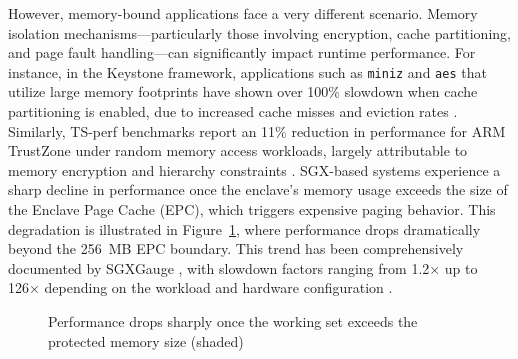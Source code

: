 However, memory-bound applications face a very different scenario. Memory isolation mechanisms—particularly those involving encryption, cache partitioning, and page fault handling—can significantly impact runtime performance. For instance, in the Keystone framework, applications such as \texttt{miniz} and \texttt{aes} that utilize large memory footprints have shown over 100\% slowdown when cache partitioning is enabled, due to increased cache misses and eviction rates \cite{Lee2019}. Similarly, TS-perf benchmarks report an 11\% reduction in performance for ARM TrustZone under random memory access workloads, largely attributable to memory encryption and hierarchy constraints \cite{suzaki2021tsperf}. SGX-based systems experience a sharp decline in performance once the enclave's memory usage exceeds the size of the Enclave Page Cache (EPC), which triggers expensive paging behavior. This degradation is illustrated in Figure~\ref{fig:epc-cliff}, where performance drops dramatically beyond the 256~MB EPC boundary. This trend has been comprehensively documented by SGXGauge \cite{kumar2022sgxgauge}, with slowdown factors ranging from 1.2× up to 126× depending on the workload and hardware configuration \cite{akkram2020scientific}.

\begin{figure}[htbp]
\centering
{}
\caption{Performance drops sharply once the working set exceeds the protected memory size (shaded)}
\label{fig:epc-cliff}
\end{figure}


